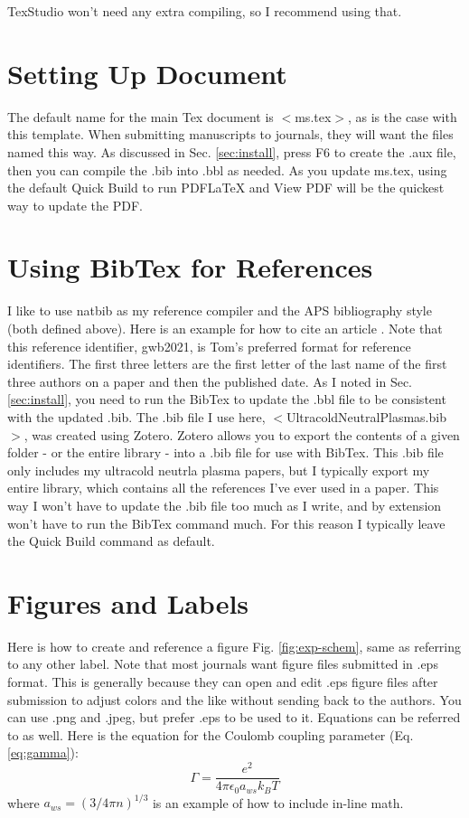 \documentclass[11pt]{article}		%
\begin{document}
TexStudio won't need any extra compiling, so I recommend using that.


\section{Setting Up Document}
\label{sec:setup}
The default name for the main Tex document is $<$ms.tex$>$, as is the case with this template. When submitting manuscripts to journals, they will want the files named this way. As discussed in Sec. \ref{sec:install}, press F6 to create the .aux file, then you can compile the .bib into .bbl as needed. As you update ms.tex, using the default Quick Build to run PDFLaTeX and View PDF will be the quickest way to update the PDF.

\section{Using BibTex for References}
\label{sec:bib}

I like to use natbib as my reference compiler and the APS bibliography style (both defined above). Here is an example for how to cite an article \cite{gwb2021}. Note that this reference identifier, gwb2021, is Tom's preferred format for reference identifiers. The first three letters are the first letter of the last name of the first three authors on a paper and then the published date. As I noted in Sec. \ref{sec:install}, you need to run the BibTex to update the .bbl file to be consistent with the updated .bib. The .bib file I use here, $<$UltracoldNeutralPlasmas.bib$>$, was created using Zotero. Zotero allows you to export the contents of a given folder - or the entire library - into a .bib file for use with BibTex. This .bib file only includes my ultracold neutrla plasma papers, but I typically export my entire library, which contains all the references I've ever used in a paper. This way I won't have to update the .bib file too much as I write, and by extension won't have to run the BibTex command much. For this reason I typically leave the Quick Build command as default.

\section{Figures and Labels}
\label{sec:figs}

Here is how to create and reference a figure Fig. \ref{fig:exp-schem}, same as referring to any other label. Note that most journals want figure files submitted in .eps format. This is generally because they can open and edit .eps figure files after submission to adjust colors and the like without sending back to the authors. You can use .png and .jpeg, but prefer .eps to be used to it. Equations can be referred to as well. Here is the equation for the Coulomb coupling parameter (Eq. \ref{eq:gamma}):
\begin{equation}
\label{eq:gamma}
\Gamma=\frac{e^2}{4\pi\epsilon_0 a_{ws} k_B T}
\end{equation}
where $a_{ws}=(3/4\pi n)^{1/3}$ is an example of how to include in-line math.
\end{document}
